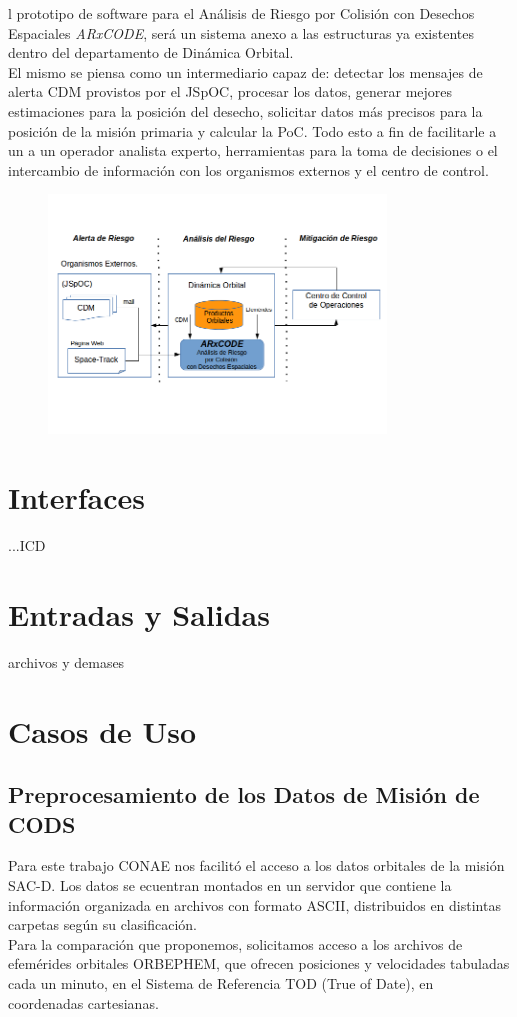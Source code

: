 l prototipo de software para el An\'alisis de Riesgo por Colisi\'on con Desechos Espaciales {\it{ARxCODE}}, ser\'a un sistema anexo a las estructuras ya existentes dentro del departamento de Din\'amica Orbital.\\
El mismo se piensa como un intermediario capaz de: detectar los mensajes de alerta CDM provistos por el JSpOC, procesar los datos, generar mejores estimaciones para la posici\'on del desecho, solicitar datos m\'as precisos para la posici\'on de la misi\'on primaria y calcular la PoC. Todo esto a fin de facilitarle a un a un operador analista experto, herramientas para la toma de decisiones o el intercambio de informaci\'on con los organismos externos y el centro de control.\\

\begin{figure}
  \includegraphics[width=0.8\textwidth]{imagenes/interfasessistemas}
\end{figure}

\section{Interfaces}

...ICD
\section{Entradas y Salidas}

archivos y demases

\section{Casos de Uso}

\subsection*{Preprocesamiento de los Datos de Misi\'on de CODS}
Para este trabajo CONAE nos facilit\'o el acceso a los datos orbitales de la misi\'on SAC-D.
Los datos se ecuentran montados en un servidor que contiene la informaci\'on organizada en archivos con formato ASCII, distribuidos en distintas carpetas seg\'un su clasificaci\'on.\\
Para la comparaci\'on que proponemos, solicitamos acceso a los archivos de efem\'erides orbitales ORBEPHEM, que ofrecen posiciones y velocidades tabuladas cada un minuto, en el Sistema de Referencia TOD (True of Date), en coordenadas cartesianas.

